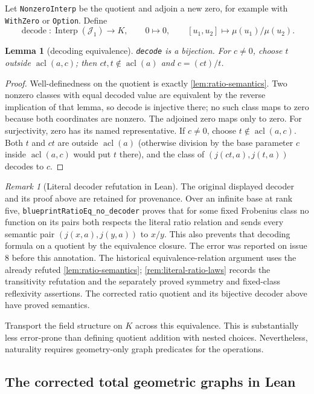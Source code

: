 \documentclass[11pt,oneside]{article}
\newtheorem{lemma}[theorem]{Lemma}
\theoremstyle{definition}
\theoremstyle{remark}
\newtheorem{remark}[theorem]{Remark}
\newcommand{\acl}{\operatorname{acl}}
\newcommand{\Jrel}{\mathcal{J}}
\newcommand{\lean}[1]{\nolinkurl{#1}}
\begin{document}
Let \lean{NonzeroInterp} be the quotient and adjoin a new zero, for example with
\lean{WithZero} or \lean{Option}.  Define
\[
 \operatorname{decode}:\operatorname{Interp}(\Jrel_1)\longrightarrow K,
\qquad
0\mapsto0,\qquad [u_1,u_2]\mapsto\mu(u_1)/\mu(u_2).
\]

\begin{lemma}[decoding equivalence]\label{lem:decode-equiv}
\lean{decode} is a bijection.  For $c\neq0$, choose $t$ outside
$\acl(a,c)$; then $ct,t\notin\acl(a)$ and $c=(ct)/t$.
\end{lemma}
\begin{proof}
Well-definedness on the quotient is exactly \cref{lem:ratio-semantics}.  Two nonzero
classes with equal decoded value are equivalent by the reverse implication of that lemma,
so decode is injective there; no such class maps to zero because both coordinates are
nonzero.  The adjoined zero maps only to zero.  For surjectivity, zero has its named
representative.  If $c\neq0$, choose $t\notin\acl(a,c)$.  Both $t$ and $ct$ are outside
$\acl(a)$ (otherwise division by the base parameter $c$ inside $\acl(a,c)$ would put
$t$ there), and the class of $(j(ct,a),j(t,a))$ decodes to $c$.
\end{proof}

\begin{remark}[Literal decoder refutation in Lean]
The original displayed decoder and its proof above are retained for provenance.
Over an infinite base at rank five, \lean{blueprintRatioEq_no_decoder} proves
that for some fixed Frobenius class no function on its pairs both respects the
literal ratio relation and sends every semantic pair $(j(x,a),j(y,a))$ to $x/y$.
This also prevents that decoding formula on a quotient by the equivalence closure.
The error was reported on issue 8 before this annotation. The historical
equivalence-relation argument uses the already refuted \cref{lem:ratio-semantics};
\cref{rem:literal-ratio-laws} records the transitivity refutation and the separately
proved symmetry and fixed-class reflexivity assertions. The corrected ratio
quotient and its bijective decoder above have proved semantics.
\end{remark}

Transport the field structure on $K$ across this equivalence.  This is substantially less
error-prone than defining quotient addition with nested choices.  Nevertheless, naturality
requires geometry-only graph predicates for the operations.

\subsection{The corrected total geometric graphs in Lean}
\end{document}
